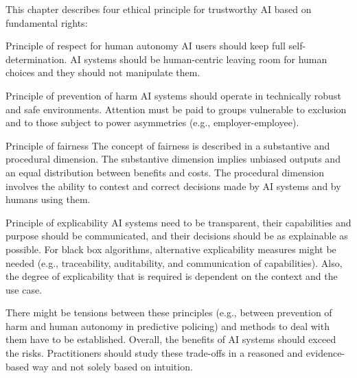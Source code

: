 This chapter describes four ethical principle for trustworthy AI based on fundamental rights:
\begin{descriptionlist}
    \item[Principle of respect for human autonomy] 
        AI users should keep full self-determination. AI systems should be human-centric leaving room for human choices and they should not manipulate them.

    
    \item[Principle of prevention of harm] 
        AI systems should operate in technically robust and safe environments. Attention must be paid to groups vulnerable to exclusion and to those subject to power asymmetries (e.g., employer-employee).


    \item[Principle of fairness] 
        The concept of fairness is described in a substantive and procedural dimension. The substantive dimension implies unbiased outputs and an equal distribution between benefits and costs. The procedural dimension involves the ability to contest and correct decisions made by AI systems and by humans using them.


    \item[Principle of explicability] 
        AI systems need to be transparent, their capabilities and purpose should be communicated, and their decisions should be as explainable as possible. For black box algorithms, alternative explicability measures might be needed (e.g., traceability, auditability, and communication of capabilities). Also, the degree of explicability that is required is dependent on the context and the use case.
\end{descriptionlist}

\begin{remark}
    There might be tensions between these principles (e.g., between prevention of harm and human autonomy in predictive policing) and methods to deal with them have to be established. Overall, the benefits of AI systems should exceed the risks. Practitioners should study these trade-offs in a reasoned and evidence-based way and not solely based on intuition. 
\end{remark}


